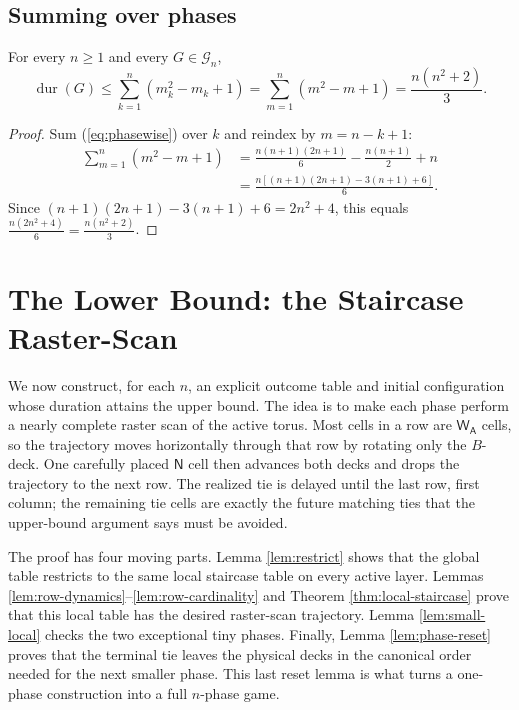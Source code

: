 \documentclass[12pt]{article}
\DeclareMathOperator{\dur}{dur}
\newcommand{\WA}{\mathsf{W_A}}
\newcommand{\NN}{\mathsf{N}}
\begin{document}
\subsection{Summing over phases}
\begin{corollary}\label{cor:upper}
For every $n\ge 1$ and every $G\in\mathcal{G}_n$,
\begin{equation}\label{eq:upper}
\dur(G) \le \sum_{k=1}^n (m_k^2-m_k+1) = \sum_{m=1}^n (m^2-m+1) = \frac{n(n^2+2)}{3}.
\end{equation}
\end{corollary}
\begin{proof}
Sum (\ref{eq:phasewise}) over $k$ and reindex by $m=n-k+1$:
\begin{align*}
\sum_{m=1}^n (m^2-m+1)
&= \frac{n(n+1)(2n+1)}{6} - \frac{n(n+1)}{2} + n \\
&= \frac{n[(n+1)(2n+1)-3(n+1)+6]}{6}.
\end{align*}
Since $(n+1)(2n+1)-3(n+1)+6=2n^2+4$, this equals $\frac{n(2n^2+4)}{6}=\frac{n(n^2+2)}{3}$.
\end{proof}


\section{The Lower Bound: the Staircase Raster-Scan}\label{sec:lower}
We now construct, for each $n$, an explicit outcome table and initial configuration whose duration attains the upper bound. The idea is to make each phase perform a nearly complete raster scan of the active torus. Most cells in a row are $\WA$ cells, so the trajectory moves horizontally through that row by rotating only the $B$-deck. One carefully placed $\NN$ cell then advances both decks and drops the trajectory to the next row. The realized tie is delayed until the last row, first column; the remaining tie cells are exactly the future matching ties that the upper-bound argument says must be avoided.

The proof has four moving parts. Lemma \ref{lem:restrict} shows that the global table restricts to the same local staircase table on every active layer. Lemmas \ref{lem:row-dynamics}--\ref{lem:row-cardinality} and Theorem \ref{thm:local-staircase} prove that this local table has the desired raster-scan trajectory. Lemma \ref{lem:small-local} checks the two exceptional tiny phases. Finally, Lemma \ref{lem:phase-reset} proves that the terminal tie leaves the physical decks in the canonical order needed for the next smaller phase. This last reset lemma is what turns a one-phase construction into a full $n$-phase game.
\end{document}
